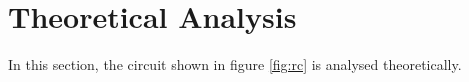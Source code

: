 \newpage
\section{Theoretical Analysis}
\label{sec:analysis}

In this section, the circuit shown in figure \ref{fig:rc} is analysed
theoretically.

\newpage







